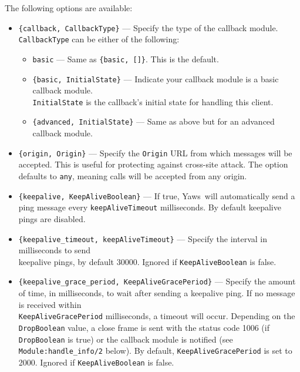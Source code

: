 \documentclass[11pt,oneside,english]{book}
\newcommand{\Yaws}            %
        {{\sc Yaws}}
\begin{document}
The following options are available:

\begin{itemize}
  \item \verb+{callback, CallbackType}+ ---
    Specify the type of the callback module. \verb+CallbackType+ can be either
    of the following:
    \begin{itemize}
      \item \verb+basic+ --- Same as \verb+{basic, []}+. This is the default.
      \item \verb+{basic, InitialState}+ --- Indicate your callback module
        is a basic callback module. \\ \verb+InitialState+ is the callback's
        initial state for handling this client.
      \item \verb+{advanced, InitialState}+ --- Same as above but for an
        advanced callback module.
    \end{itemize}

  \item \verb+{origin, Origin}+ ---
    Specify the \verb+Origin+ URL from which messages will be accepted. This is
    useful for protecting against cross-site attack. The option defaults to
    \verb+any+, meaning calls will be accepted from any origin.

    \item \verb+{keepalive, KeepAliveBoolean}+ ---
      If true, \Yaws\ will automatically send a ping message every
      \verb+keepAliveTimeout+ milliseconds. By default keepalive pings are
      disabled.

    \item \verb+{keepalive_timeout, keepAliveTimeout}+ ---
      Specify the interval in milliseconds to send \\ keepalive pings, by
      default 30000. Ignored if \verb+KeepAliveBoolean+ is false.

    \item \verb+{keepalive_grace_period, KeepAliveGracePeriod}+ ---
      Specify the amount of time, in milliseconds, to wait after sending a
      keepalive ping. If no message is received within \\
      \verb+KeepAliveGracePeriod+ milliseconds, a timeout will
      occur. Depending on the \verb+DropBoolean+ value, a close frame is
      sent with the status code 1006 (if \verb+DropBoolean+ is true) or the
      callback module is notified (see \verb+Module:handle_info/2+
      below). By default, \verb+KeepAliveGracePeriod+ is set to
      2000. Ignored if \verb+KeepAliveBoolean+ is false.


\end{itemize}
\end{document}
